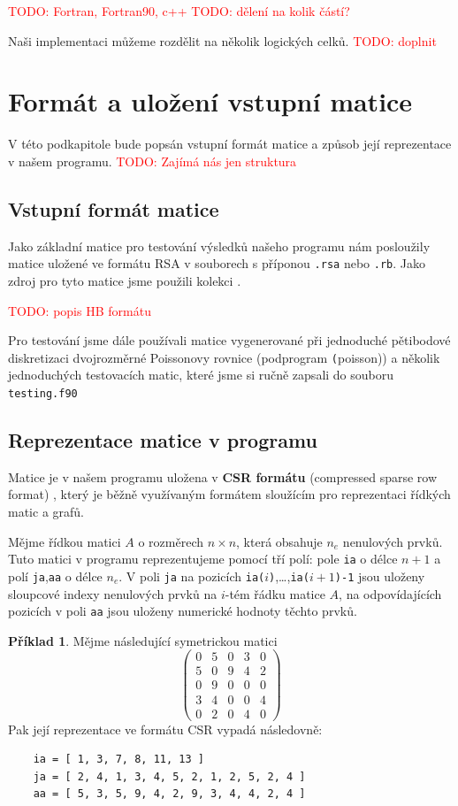 \documentclass[11pt,american,czech,oneside]{book}
\theoremstyle{plain}
\theoremstyle{definition}
\newtheorem{example}{Příklad}
\newcommand{\TODO}[1]{\textcolor{red}{TODO: #1}}
\begin{document}
\TODO{Fortran, Fortran90, c++}
\TODO{dělení na kolik částí?}

Naši implementaci můžeme rozdělit na několik logických celků. \TODO{doplnit}

\section{Formát a uložení vstupní matice}
V této podkapitole bude popsán vstupní formát matice a způsob její reprezentace v našem programu.
\TODO{Zajímá nás jen struktura}

\subsection{Vstupní formát matice}

Jako základní matice pro testování výsledků našeho programu nám posloužily matice uložené ve formátu RSA v souborech s příponou \texttt{.rsa} nebo \texttt{.rb}. Jako zdroj pro tyto matice jsme použili kolekci \cite{hbcol}.

\TODO{popis HB formátu}

Pro testování jsme dále používali matice vygenerované při jednoduché pětibodové diskretizaci dvojrozměrné Poissonovy rovnice (podprogram \texttt(poisson)) a několik jednoduchých testovacích matic, které jsme si ručně zapsali do souboru \texttt{testing.f90}

\subsection{Reprezentace matice v programu}

Matice je v našem programu uložena v \textbf{CSR formátu} (compressed sparse row format) \cite{pis:84,saad:94}, který je běžně využívaným formátem sloužícím pro reprezentaci řídkých matic a grafů. 

Mějme řídkou matici $A$ o rozměrech $n \times n$, která obsahuje $n_e$ nenulových prvků. Tuto matici v programu reprezentujeme pomocí tří polí: pole \texttt{ia} o délce $n+1$ a polí \texttt{ja},\texttt{aa} o délce $n_e$. V poli \texttt{ja} na pozicích \texttt{ia($i$)},\ldots,\texttt{ia($i+1$)-1} jsou uloženy sloupcové indexy nenulových prvků na $i$-tém řádku matice $A$, na odpovídajících pozicích v poli \texttt{aa} jsou uloženy numerické hodnoty těchto prvků.

\begin{example}
  \label{CSRexample}
  Mějme následující symetrickou matici
  \[
    \begin{pmatrix}
      0 & 5 & 0 & 3 & 0 \\
      5 & 0 & 9 & 4 & 2 \\
      0 & 9 & 0 & 0 & 0 \\
      3 & 4 & 0 & 0 & 4 \\
      0 & 2 & 0 & 4 & 0
    \end{pmatrix}
  \]
  Pak její reprezentace ve formátu CSR vypadá následovně:
  \begin{verbatim}
    ia = [ 1, 3, 7, 8, 11, 13 ]
    ja = [ 2, 4, 1, 3, 4, 5, 2, 1, 2, 5, 2, 4 ]
    aa = [ 5, 3, 5, 9, 4, 2, 9, 3, 4, 4, 2, 4 ]
  \end{verbatim}
\end{example}
\end{document}
